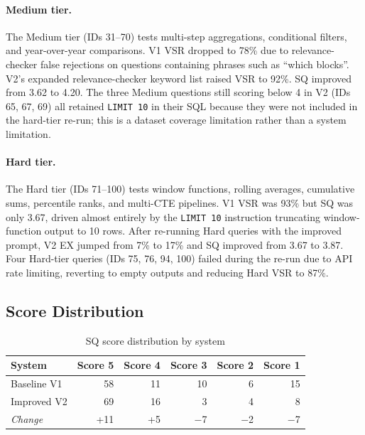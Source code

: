\documentclass{article}
\begin{document}
\paragraph{Medium tier.}
The Medium tier (IDs 31--70) tests multi-step aggregations, conditional filters, and year-over-year comparisons. V1 VSR dropped to 78\% due to relevance-checker false rejections on questions containing phrases such as ``which blocks''. V2's expanded relevance-checker keyword list raised VSR to 92\%. SQ improved from 3.62 to 4.20. The three Medium questions still scoring below 4 in V2 (IDs 65, 67, 69) all retained \texttt{LIMIT 10} in their SQL because they were not included in the hard-tier re-run; this is a dataset coverage limitation rather than a system limitation.

\paragraph{Hard tier.}
The Hard tier (IDs 71--100) tests window functions, rolling averages, cumulative sums, percentile ranks, and multi-CTE pipelines. V1 VSR was 93\% but SQ was only 3.67, driven almost entirely by the \texttt{LIMIT 10} instruction truncating window-function output to 10 rows. After re-running Hard queries with the improved prompt, V2 EX jumped from 7\% to 17\% and SQ improved from 3.67 to 3.87. Four Hard-tier queries (IDs 75, 76, 94, 100) failed during the re-run due to API rate limiting, reverting to empty outputs and reducing Hard VSR to 87\%.

\subsection{Score Distribution}

\begin{table}[h]
\centering
\caption{SQ score distribution by system}
\label{tab:sq_dist}
\begin{tabular}{lrrrrr}
\toprule
\textbf{System} & \textbf{Score 5} & \textbf{Score 4} & \textbf{Score 3}
               & \textbf{Score 2} & \textbf{Score 1} \\
\midrule
Baseline V1 & 58 & 11 & 10 & 6 & 15 \\
Improved V2 & 69 & 16 &  3 & 4 &  8 \\
\midrule
\textit{Change} & +11 & +5 & $-$7 & $-$2 & $-$7 \\
\bottomrule
\end{tabular}
\end{table}
\end{document}
